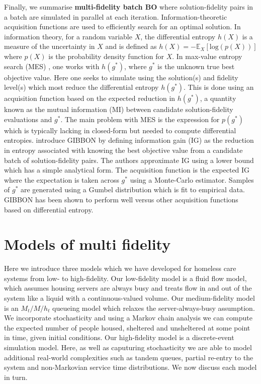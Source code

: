 \documentclass[12pt,a4paper]{article}
\begin{document}
Finally, we summarise \textbf{multi-fidelity batch BO} where solution-fidelity pairs in a batch are simulated in parallel at each iteration. Information-theoretic acquisition functions are used to efficiently search for an optimal solution. In information theory, for a random variable $X$, the differential entropy $h(X)$ is a measure of the uncertainty in $X$ and is defined as $h(X) = -\mathbb{E}_{X}[\text{log}(p(X))]$ where $p(X)$ is the probability density function for $X$. In max-value entropy search (MES) \citep{wang2017max}, one works with $h(g^{*})$, where $g^{*}$ is the unknown true best objective value. Here one seeks to simulate using the solution(s) and fidelity level(s) which most reduce the differential entropy  $h(g^{*})$. This is done using an acquisition function based on the expected reduction in $h(g^{*})$, a quantity known as the mutual information (MI) between candidate solution-fidelity evaluations and $g^{*}$. The main problem with MES is the expression for $p(g^{*})$ which is typically lacking in closed-form but needed to compute differential entropies. \cite{moss2021gibbon} introduce GIBBON by defining information gain (IG) as the reduction in entropy associated with knowing the best objective value from a candidate batch of solution-fidelity pairs. The authors approximate IG using a lower bound which has a simple analytical form. The acquisition function is the expected IG where the expectation is taken across $g^{*}$ using a Monte-Carlo estimator. Samples of $g^{*}$ are generated using a Gumbel distribution which is fit to empirical data. GIBBON has been shown to perform well versus other acquisition functions based on differential entropy. 

\newpage

\section{Models of multi fidelity} \label{models}
%
Here we introduce three models which we have developed for homeless care systems from low- to high-fidelity. Our low-fidelity model is a fluid flow model, which assumes housing servers are always busy and treats flow in and out of the system like a liquid with a continuous-valued volume. Our medium-fidelity model is an $M_t/M/h_t$ queueing model which relaxes the server-always-busy assumption. We incorporate stochasticity and using a Markov chain analysis we can compute the expected number of people housed, sheltered and unsheltered at some point in time, given initial conditions. Our high-fidelity model is a discrete-event simulation model. Here, as well as caputuring stochasticity we are able to model additional real-world complexities such as tandem queues, partial re-entry to the system and non-Markovian service time distributions. We now discuss each model in turn.
%
\end{document}
